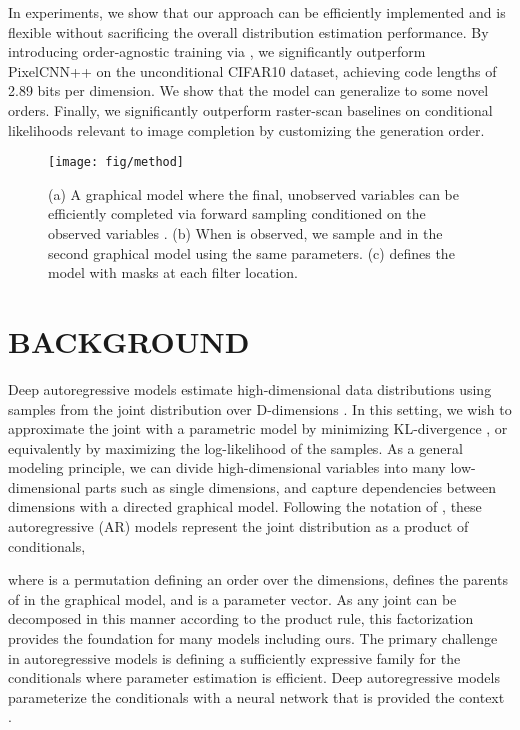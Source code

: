 \documentclass[letterpaper]{article}
\begin{document}
In experiments, we show that our approach can be efficiently implemented and is flexible without sacrificing the overall distribution estimation performance. By introducing order-agnostic training via \ours{}, we significantly outperform PixelCNN++ on the unconditional CIFAR10 dataset, achieving code lengths of 2.89 bits per dimension. We show that the model can generalize to some novel orders. Finally, we significantly outperform raster-scan baselines on conditional likelihoods relevant to image completion by customizing the generation order.

\begin{figure*}[!t]
	\centering
	\texttt{[image: fig/method]}
	\vspace{-8mm}
	\caption{(a) A graphical model where the final, unobserved variables  can be efficiently completed via forward sampling conditioned on the observed variables . (b) When  is observed, we sample  and  in the second graphical model using the same parameters. (c) \ours{} defines the model with masks at each filter location.}
	\label{fig:method}
\end{figure*}

\section{BACKGROUND}
Deep autoregressive models estimate high-dimensional data distributions using samples from the joint distribution over D-dimensions . In this setting, we wish to approximate the joint with a parametric model  by minimizing KL-divergence , or equivalently by maximizing the log-likelihood of the samples. As a general modeling principle, we can divide high-dimensional variables into many low-dimensional parts such as single dimensions, and capture dependencies between dimensions with a directed graphical model. Following the notation of \citep{kingma2019introduction}, these autoregressive (AR) models represent the joint distribution as a product of conditionals,

where  is a permutation defining an order over the dimensions,  defines the parents of  in the graphical model, and  is a parameter vector. 
As any joint can be decomposed in this manner according to the product rule, this factorization provides the foundation for many models including ours. The primary challenge in autoregressive models is defining a sufficiently expressive family for the conditionals where parameter estimation is efficient. Deep autoregressive models parameterize the conditionals with a neural network that is provided the context .
\end{document}
